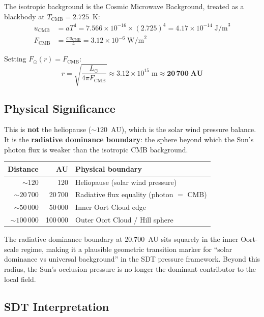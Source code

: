 The isotropic background is the Cosmic Microwave Background, treated as a blackbody at $T_{\text{CMB}} = 2.725$~K:
\begin{align}
  u_{\text{CMB}} &= a T^4 = 7.566 \times 10^{-16} \times (2.725)^4 = 4.17 \times 10^{-14}\;\text{J/m}^3 \\
  F_{\text{CMB}} &= \frac{c\,u_{\text{CMB}}}{4} = 3.12 \times 10^{-6}\;\text{W/m}^2
\end{align}

Setting $F_\odot(r) = F_{\text{CMB}}$:
\begin{equation}
  r = \sqrt{\frac{L_\odot}{4\pi F_{\text{CMB}}}} \approx 3.12 \times 10^{15}\;\text{m} \approx \mathbf{20\,700\;\text{AU}}
\end{equation}

\subsection{Physical Significance}

This is \textbf{not} the heliopause ($\sim 120$~AU), which is the solar wind pressure balance. It is the \textbf{radiative dominance boundary}: the sphere beyond which the Sun's photon flux is weaker than the isotropic CMB background.

\begin{center}
\begin{tabular}{rrl}
\toprule
\textbf{Distance} & \textbf{AU} & \textbf{Physical boundary} \\
\midrule
$\sim 120$       & 120     & Heliopause (solar wind pressure) \\
$\sim 20\,700$   & 20\,700 & Radiative flux equality (photon $=$ CMB) \\
$\sim 50\,000$   & 50\,000 & Inner Oort Cloud edge \\
$\sim 100\,000$  & 100\,000 & Outer Oort Cloud / Hill sphere \\
\bottomrule
\end{tabular}
\end{center}

The radiative dominance boundary at 20,700~AU sits squarely in the inner Oort-scale regime, making it a plausible geometric transition marker for ``solar dominance vs universal background'' in the SDT pressure framework. Beyond this radius, the Sun's occlusion pressure is no longer the dominant contributor to the local field.

\subsection{SDT Interpretation}

